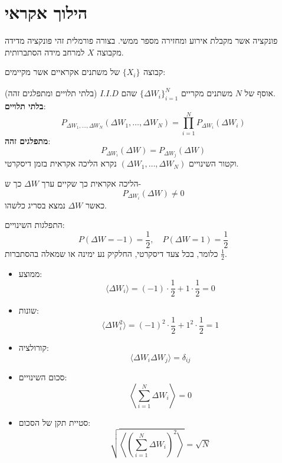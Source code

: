 \documentclass{tstextbook}
\begin{document}
\section{הילוך אקראי}

\begin{reminder}
פונקציה אשר מקבלת אירוע ומחזירה מספר ממשי. בצורה פורמלית זהי פונקציה מדידה מקבוצה \(X\) למרחב מידה הסתברותית.

\end{reminder}
\begin{definition}
קבוצה \(\{ X_{i} \}_{}\) של משתנים אקראיים אשר מקיימים:

\end{definition}
\begin{definition}
אוסף של \(N\) משתנים מקריים \(\{ \Delta W_i \}_{i=1}^N\) שהם \(I.I.D\) (בלתי תלויים ומתפלגים זהה).\\
\textbf{בלתי תלויים}:
$$P_{\Delta W_1, \dots, \Delta W_N}(\Delta W_1, \dots, \Delta W_N) = \prod_{i=1}^N P_{\Delta W_i}(\Delta W_i)$$\textbf{מתפלגים זהה}:
$$P_{\Delta W_i}(\Delta W) = P_{\Delta W_j}(\Delta W)$$
וקטור השינויים \((\Delta W_1,\dots,\Delta W_N)\) נקרא הליכה אקראית בזמן דיסקרטי.

\end{definition}
\begin{definition}
הליכה אקראית כך שקיים ערך \(\Delta W\) כך ש-
$$P_{\Delta W_i}(\Delta W) \neq 0$$
כאשר \(\Delta W\) נמצא בסריג כלשהו.

\end{definition}
\begin{definition}
התפלגות השינויים:\\
$$P(\Delta W = -1) = \frac{1}{2}, \quad P(\Delta W = 1) = \frac{1}{2}$$
כלומר, בכל צעד דיסקרטי, החלקיק נע ימינה או שמאלה בהסתברות \(\frac{1}{2}\).

\end{definition}
\begin{proposition}
  \begin{itemize}
    \item ממוצע: 
$$\langle \Delta W_i \rangle = (-1)\cdot\frac{1}{2} + 1\cdot\frac{1}{2} = 0$$
    \item שונות: 
$$\langle \Delta W_i^2 \rangle = (-1)^2\cdot\frac{1}{2} + 1^2\cdot\frac{1}{2} = 1$$
    \item קורולציה:
$$\langle \Delta W_i \Delta W_j \rangle = \delta_{ij}$$
    \item סכום השינויים:
$$\left\langle \sum_{i=1}^N \Delta W_i \right\rangle = 0$$
    \item סטיית תקן של הסכום:
$$\sqrt{ \left\langle \left( \sum_{i=1}^N \Delta W_i \right)^2 \right\rangle } = \sqrt{N}$$
  \end{itemize}
\end{proposition}
\end{document}
